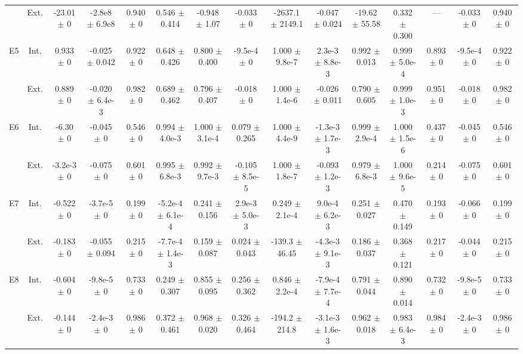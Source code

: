 \begin{table}[htbp]
{\begin{tabular}{@{}ccccccccccccccc@{}}
 & Ext. & -23.01 $\pm$ 0 & -2.8e8 $\pm$ 6.9e8 & 0.940 $\pm$ 0 & 0.546 $\pm$ 0.414 & -0.948 $\pm$ 1.07 & -0.033 $\pm$ 0 & -2637.1 $\pm$ 2149.1 & -0.047 $\pm$ 0.024 & -19.62 $\pm$ 55.58 & 0.332 $\pm$ 0.300 & --- & -0.033 $\pm$ 0 & 0.940 $\pm$ 0 \\
\cline{2-15}
\multirow{2}{*}{E5} & Int. & 0.933 $\pm$ 0 & -0.025 $\pm$ 0.042 & 0.922 $\pm$ 0 & 0.648 $\pm$ 0.426 & 0.800 $\pm$ 0.400 & -9.5e-4 $\pm$ 0 & 1.000 $\pm$ 9.8e-7 & 2.3e-3 $\pm$ 8.8e-3 & 0.992 $\pm$ 0.013 & 0.999 $\pm$ 5.0e-4 & 0.893 $\pm$ 0 & -9.5e-4 $\pm$ 0 & 0.922 $\pm$ 0 \\
 & Ext. & 0.889 $\pm$ 0 & -0.020 $\pm$ 6.4e-3 & 0.982 $\pm$ 0 & 0.689 $\pm$ 0.462 & 0.796 $\pm$ 0.407 & -0.018 $\pm$ 0 & 1.000 $\pm$ 1.4e-6 & -0.026 $\pm$ 0.011 & 0.790 $\pm$ 0.605 & 0.999 $\pm$ 1.0e-3 & 0.951 $\pm$ 0 & -0.018 $\pm$ 0 & 0.982 $\pm$ 0 \\
\cline{2-15}
\multirow{2}{*}{E6} & Int. & -6.30 $\pm$ 0 & -0.045 $\pm$ 0 & 0.546 $\pm$ 0 & 0.994 $\pm$ 4.0e-3 & 1.000 $\pm$ 3.1e-4 & 0.079 $\pm$ 0.265 & 1.000 $\pm$ 4.4e-9 & -1.3e-3 $\pm$ 1.7e-3 & 0.999 $\pm$ 2.9e-4 & 1.000 $\pm$ 1.5e-6 & 0.437 $\pm$ 0 & -0.045 $\pm$ 0 & 0.546 $\pm$ 0 \\
 & Ext. & -3.2e-3 $\pm$ 0 & -0.075 $\pm$ 0 & 0.601 $\pm$ 0 & 0.995 $\pm$ 6.8e-3 & 0.992 $\pm$ 9.7e-3 & -0.105 $\pm$ 8.5e-5 & 1.000 $\pm$ 1.8e-7 & -0.093 $\pm$ 1.2e-3 & 0.979 $\pm$ 6.8e-3 & 1.000 $\pm$ 9.6e-5 & 0.214 $\pm$ 0 & -0.075 $\pm$ 0 & 0.601 $\pm$ 0 \\
\cline{2-15}
\multirow{2}{*}{E7} & Int. & -0.522 $\pm$ 0 & -3.7e-5 $\pm$ 0 & 0.199 $\pm$ 0 & -5.2e-4 $\pm$ 6.1e-4 & 0.241 $\pm$ 0.156 & 2.9e-3 $\pm$ 5.0e-3 & 0.249 $\pm$ 2.1e-4 & 9.0e-4 $\pm$ 6.2e-3 & 0.251 $\pm$ 0.027 & 0.470 $\pm$ 0.149 & 0.193 $\pm$ 0 & -0.066 $\pm$ 0 & 0.199 $\pm$ 0 \\
 & Ext. & -0.183 $\pm$ 0 & -0.055 $\pm$ 0.094 & 0.215 $\pm$ 0 & -7.7e-4 $\pm$ 1.4e-3 & 0.159 $\pm$ 0.087 & 0.024 $\pm$ 0.043 & -139.3 $\pm$ 46.45 & -4.3e-3 $\pm$ 9.1e-3 & 0.186 $\pm$ 0.037 & 0.368 $\pm$ 0.121 & 0.217 $\pm$ 0 & -0.044 $\pm$ 0 & 0.215 $\pm$ 0 \\
\cline{2-15}
\multirow{2}{*}{E8} & Int. & -0.604 $\pm$ 0 & -9.8e-5 $\pm$ 0 & 0.733 $\pm$ 0 & 0.249 $\pm$ 0.307 & 0.855 $\pm$ 0.095 & 0.256 $\pm$ 0.362 & 0.846 $\pm$ 2.2e-4 & -7.9e-4 $\pm$ 7.7e-4 & 0.791 $\pm$ 0.044 & 0.890 $\pm$ 0.014 & 0.732 $\pm$ 0 & -9.8e-5 $\pm$ 0 & 0.733 $\pm$ 0 \\
 & Ext. & -0.144 $\pm$ 0 & -2.4e-3 $\pm$ 0 & 0.986 $\pm$ 0 & 0.372 $\pm$ 0.461 & 0.968 $\pm$ 0.020 & 0.326 $\pm$ 0.464 & -194.2 $\pm$ 214.8 & -3.1e-3 $\pm$ 1.6e-3 & 0.962 $\pm$ 0.018 & 0.983 $\pm$ 6.4e-3 & 0.984 $\pm$ 0 & -2.4e-3 $\pm$ 0 & 0.986 $\pm$ 0 \\

\end{tabular}}
\end{table}
